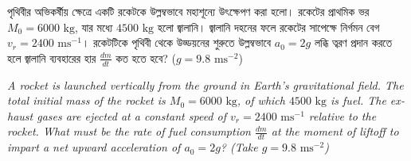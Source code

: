 \documentclass[12pt, a4paper]{article}
\begin{document}
\newpage

\begin{tcolorbox}[questionbox={প্রশ্ন (Question) 39}]
    \noindent
    পৃথিবীর অভিকর্ষীয় ক্ষেত্রে একটি রকেটকে উল্লম্বভাবে মহাশূন্যে উৎক্ষেপণ করা হলো। রকেটের প্রাথমিক ভর $M_0 = 6000\text{ kg}$, যার মধ্যে $4500\text{ kg}$ হলো জ্বালানি। জ্বালানি দহনের ফলে রকেটের সাপেক্ষে নির্গমন বেগ $v_r = 2400\text{ ms}^{-1}$। রকেটটিকে পৃথিবী থেকে উড্ডয়নের শুরুতে উল্লম্বভাবে $a_0 = 2g$ লব্ধি ত্বরণ প্রদান করতে হলে জ্বালানি ব্যবহারের হার $\frac{dm}{dt}$ কত হতে হবে? ($g = 9.8\text{ ms}^{-2}$)
    
    \vspace{0.8em}
    \begin{english}
    \noindent\textit{\color{darkgray}
    A rocket is launched vertically from the ground in Earth's gravitational field. The total initial mass of the rocket is $M_0 = 6000\text{ kg}$, of which $4500\text{ kg}$ is fuel. The exhaust gases are ejected at a constant speed of $v_r = 2400\text{ ms}^{-1}$ relative to the rocket. What must be the rate of fuel consumption $\frac{dm}{dt}$ at the moment of liftoff to impart a net upward acceleration of $a_0 = 2g$? (Take $g = 9.8\text{ ms}^{-2}$)
    }
    \end{english}
\end{tcolorbox}

\vspace{1em}
\begin{center}
\end{center}
\vspace{1em}
\end{document}
